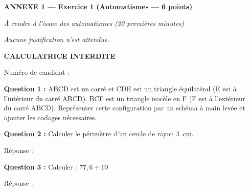 \documentclass[a4paper,12pt]{article}
\begin{document}
\newpage
{\small

\begin{center}
\begin{tcolorbox}[
  width=\linewidth,
  colback=gray!8,
  colframe=black,
  arc=2pt,
  boxrule=0.8pt,
  top=5pt, bottom=5pt
]
\centerline{\large\bfseries ANNEXE 1 — Exercice 1 (Automatismes — 6 points)}
\smallskip
\centerline{\textit{À rendre à l'issue des automatismes (20 premières minutes)}}
\smallskip
\centerline{\textit{Aucune justification n'est attendue.}}
\medskip
\centerline{\Large\bfseries CALCULATRICE INTERDITE}
\end{tcolorbox}
\end{center}

\vspace{2pt}

\noindent Numéro de candidat :

\vspace{6pt}

\noindent\textbf{Question 1 :}
ABCD est un carré et CDE est un triangle équilatéral (E est à l'intérieur du carré ABCD).
BCF est un triangle isocèle en F (F est à l'extérieur du carré ABCD).
Représenter cette configuration par un schéma à main levée et ajouter les codages nécessaires.

\vspace{-2pt}
\begin{center}
\end{center}

\vspace{2pt}

\noindent\textbf{Question 2 :}
Calculer le périmètre d'un cercle de rayon 3~cm.

\vspace{1pt}
\noindent Réponse : \dotfill

\vspace{6pt}

\noindent\textbf{Question 3 :}
Calculer : $77{,}6 \div 10$

\vspace{1pt}
\noindent Réponse : \dotfill

}
\end{document}
